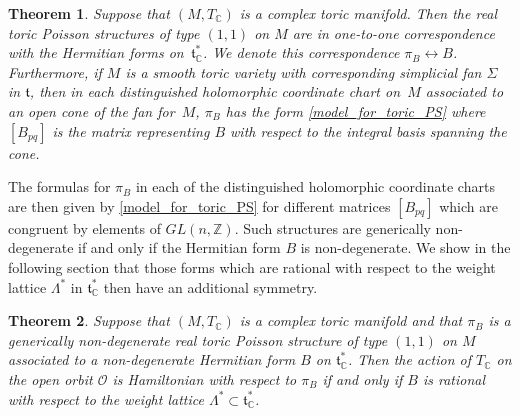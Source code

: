 \documentclass[pdftex]{sigma}
\numberwithin{equation}{section}
\newtheorem{Theorem}{Theorem}[section]
\begin{document}
\begin{Theorem}\label{1st_main_theorem}
Suppose that $(M,T_{\mathbb C})$ is a complex toric manifold. Then the real toric Poisson structures of type $(1,1)$ on $M$ are in one-to-one correspondence with the Hermitian forms on~${\mathfrak t}_{\mathbb C}^*$. We denote this correspondence $\pi_B\leftrightarrow B$. Furthermore, if $M$ is a smooth toric variety with corresponding simplicial fan $\Sigma$ in ${\mathfrak t}$, then in each distinguished holomorphic coordinate chart on~$M$ associated to an open cone of the fan for~$M$, $\pi_B$ has the form \eqref{model_for_toric_PS} where $[B_{pq}]$ is the matrix representing $B$ with respect to the integral basis spanning the cone.
\end{Theorem}

The formulas for $\pi_B$ in each of the distinguished holomorphic coordinate charts are then given by \eqref{model_for_toric_PS} for dif\/ferent matrices $[B_{pq}]$ which are congruent by elements of $GL(n,{\mathbb Z})$. Such structures are generically non-degenerate if and only if the Hermitian form $B$ is non-degenerate. We show in the following section that those forms which are rational with respect to the weight lattice $\Lambda^*$ in ${\mathfrak t}_{\mathbb C}^*$ then have an additional symmetry.

\begin{Theorem}\label{2nd_main_theorem}
Suppose that $(M,T_{\mathbb C})$ is a complex toric manifold and that $\pi_B$ is a generically non-degenerate real toric Poisson structure of type $(1,1)$ on $M$ associated to a non-degenerate Hermitian form $B$ on ${\mathfrak t}_{\mathbb C}^*$. Then the action of $T_{\mathbb C}$ on the open orbit $\mathcal O$ is Hamiltonian with respect to $\pi_B$ if and only if $B$ is rational with respect to the weight lattice $\Lambda^*\subset{\mathfrak t}_{\mathbb C}^*$.
\end{Theorem}
\end{document}
